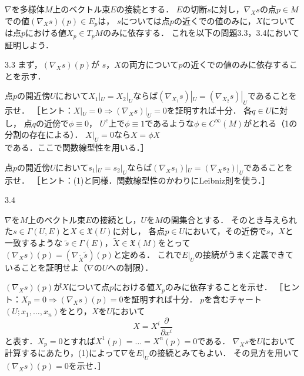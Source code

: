 \documentclass[uplatex,dvipdfmx,fontsize=12pt,jafontsize=11pt,line_length=42zw,number_of_lines=36,hanging_punctuation]{jlreq}
\begin{document}
$\nabla$を多様体$M$上のベクトル束$E$の接続とする．
$E$の切断$s$に対し，$\nabla_Xs$の点$p\in M$での値$(\nabla_Xs)(p)\in E_p$は，
$s$については点$p$の近くでの値のみに，$X$については点$p$における値$X_p\in T_pM$のみに依存する．
これを以下の問題3.3，3.4において証明しよう．

\begin{problems}
	\item[3.3]
		まず，$(\nabla_Xs)(p)$が
		$s$，$X$の両方について$p$の近くでの値のみに依存することを示す．
		\begin{subproblems}
			\item
				点$p$の開近傍$U$において$X_1|_U=X_2|_U$ならば$(\nabla_{X_1}s)|_U=(\nabla_{X_2}s)|_U$であることを示せ．
				［ヒント：$X|_U=0\Longrightarrow(\nabla_Xs)|_U=0$を証明すれば十分．
				各$q\in U$に対し，
				点$q$の近傍で$\phi\equiv 0$，
				$U^c$上で$\phi\equiv 1$であるような$\phi\in C^\infty(M)$がとれる（1の分割の存在による）．
				$X|_U=0$なら$X=\phi X$である．ここで関数線型性を用いる．］
			\item
				点$p$の開近傍$U$において$s_1|_U=s_2|_U$ならば$(\nabla_Xs_1)|_U=(\nabla_Xs_2)|_U$であることを示せ．
				［ヒント：(1)と同様．関数線型性のかわりにLeibniz則を使う．］
		\end{subproblems}
		\clearpage
	\item[3.4]\phantom{}\vspace{-\baselineskip}
		\begin{subproblems}
			\item
				$\nabla$を$M$上のベクトル束$E$の接続とし，$U$を$M$の開集合とする．
				そのとき与えられた$s\in\Gamma(U,E)$と$X\in\mathfrak{X}(U)$に対し，
				各点$p\in U$において，その近傍で$s$，$X$と一致するような
				$\tilde{s}\in\Gamma(E)$，$\tilde{X}\in\mathfrak{X}(M)$をとって
				$(\nabla_Xs)(p)=(\nabla_{\tilde{X}}\tilde{s})(p)$と定める．
				これで$E|_U$の接続がうまく定義できていることを証明せよ（$\nabla$の$U$への制限）．
			\item
				$(\nabla_Xs)(p)$が$X$について点$p$における値$X_p$のみに依存することを示せ．
				［ヒント：$X_p=0\Longrightarrow(\nabla_Xs)(p)=0$を証明すれば十分．
				$p$を含むチャート$(U;x_1,\dots,x_n)$をとり，$X$を$U$において
				\begin{equation}
					X=X^i\frac{\partial}{\partial x^i}
				\end{equation}
				と表す．$X_p=0$とすれば$X^1(p)=\dots=X^n(p)=0$である．
				$\nabla_Xs$を$U$において計算するにあたり，(1)によって$\nabla$を$E|_U$の接続とみてもよい．
				その見方を用いて$(\nabla_Xs)(p)=0$を示せ．］
		\end{subproblems}
\end{problems}
\end{document}
